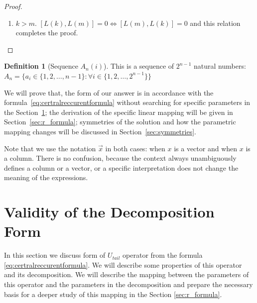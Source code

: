 \documentclass[a4paper, openany, 12pt]{article}
\theoremstyle{remark}
\theoremstyle{definition}
\newtheorem{definition}{Definition}[section]
\begin{document}
\begin{proof}
\begin{enumerate}
Therefore:

\begin{equation}
[L(k),L(m)] = L(k)L(m) - L(m)L(k) = 0
\end{equation}

\item $k>m$. $[L(k),L(m)] = 0 \Leftrightarrow [L(m),L(k)] = 0$ and this relation completes the proof.
\end{enumerate}

\end{proof}


\begin{definition}[Sequence $A_n(i)$]
This is a sequence of $2^{n-1}$ natural numbers: $A_n = \{a_i \in \{1,2,\dots,n-1\}: \forall i \in \{1,2,\dots,2^{n-1}\}\}$
\end{definition}

We will prove that, the form of our answer is in accordance with the formula~\eqref{eq:certralreccurentformula} without searching for specific parameters in the Section~\ref{sec:Chapter5}; the derivation of the specific linear mapping will be given in Section~\ref{sec:r_formula}; symmetries of the solution and how the parametric mapping changes will be discussed in Section~\ref{sec:symmetries}.

Note that we use the notation $\vec{x}$ in both cases: when $x$ is a vector and when $x$ is a column. There is no confusion, because the context always unambiguously defines a column or a vector, or a specific interpretation does not change the meaning of the expressions.





\section{Validity of the Decomposition Form}
\label{sec:Chapter5} 

In this section we discuss form of $U_{tail}$ operator from the formula \eqref{eq:certralreccurentformula}. We will describe some properties of this operator and its decomposition. We will describe the mapping between the parameters of this operator and the parameters in the decomposition and prepare the necessary basis for a deeper study of this mapping in the Section \ref{sec:r_formula}.
\end{document}
